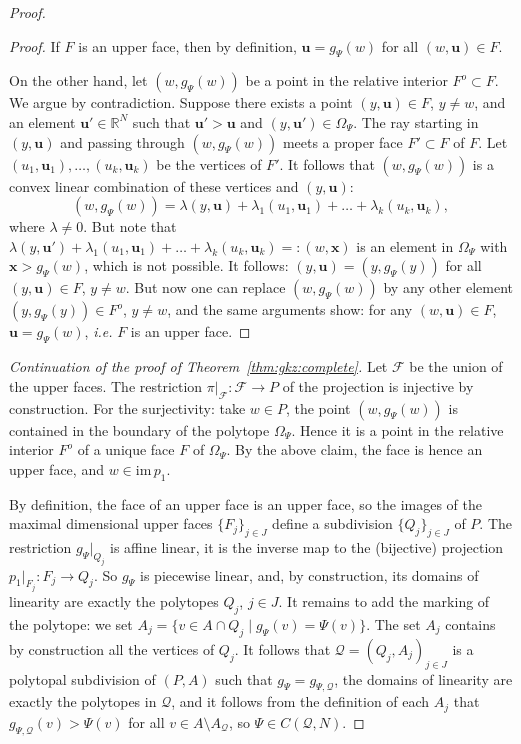 \documentclass[10pt,a4paper]{amsart}
\begin{document}
\begin{proof}
\begin{proof}
If $F$ is an upper face, then by definition, $\mathbf u=g_{\Psi}(w)$ for all $( w,\mathbf u)\in F$. 

On the other hand, let $(  w,g_{\Psi}(  w))$ be a point in the relative interior $F^o\subset F$. We argue by contradiction. Suppose there exists a point $( y, \mathbf u)\in F$, $ y\not= w$, and an element 
$\mathbf u'\in \mathbb R^N$ such that $\mathbf u'>\mathbf u$ and $(  y, \mathbf u')\in \Omega_\Psi$. 
The ray starting in $(  y,\mathbf u)$ and passing through $(  w,g_{\Psi}( w))$ 
meets a proper face $F'\subset F$ of $F$. 
Let $( u_1,\mathbf u_1),\ldots,(  u_k,\mathbf u_k)$ be the vertices of $F'$. It follows that 
$(  w,g_{\Psi}(  w))$ is a convex linear combination of these vertices and $(  y,\mathbf u)$:
\[
(  w,g_{\Psi}(  w))= \lambda (  y,\mathbf u)+\lambda_1(  u_1,\mathbf u_1)+\ldots +\lambda_k(  u_k,\mathbf u_k),
\]
where $\lambda\not=0$. But note that $\lambda (  y,\mathbf u')+\lambda_1( u_1,\mathbf u_1)+\ldots +\lambda_k(  u_k,\mathbf u_k)=:(  w,\mathbf x)$ 
is an element in $\Omega_\Psi$ with $\mathbf x>g_{\Psi}(  w)$, which is not possible. It follows: $(  y,\mathbf u)
=(  y,g_{\Psi}(  y))$ for all $(  y,\mathbf u)\in F$, $  y\not=  w$. But now one can replace $(  w,g_{\Psi}(  w))$ 
by any other element $(  y,g_{\Psi}(  y))\in F^o$, $  y\not=  w$, and the same arguments show: for any
$(  w,\mathbf u)\in F$, $\mathbf u=g_{\Psi}(  w)$, \emph{i.e.} $F$ is an upper face.
\end{proof}

\par
\noindent
\textit{Continuation of the proof of Theorem~\ref{thm:gkz:complete}.}
Let $\mathcal F$ be the union of the upper faces. The restriction $\pi\vert_{\mathcal F}:\mathcal F\rightarrow P$ of the projection is injective by construction. For the surjectivity: take $w\in P$, the point $(w,g_{\Psi}( w))$ is contained in the boundary of the polytope $\Omega_\Psi$. Hence it is a point in the relative interior $F^o$ of a unique face $F$ of $\Omega_\Psi$. By the above claim, the face is hence an upper face, and 
$  w\in \mathrm{im\,}p_1$.

By definition, the face of an upper face is an upper face, so the images of the maximal dimensional 
upper faces $\{F_j\}_{j\in J}$ define a subdivision $\{Q_j\}_{j\in J}$ of $P$.
The restriction $g_\Psi\vert_{Q_j}$ is affine linear, it is the inverse map to the (bijective) projection 
$p_1\vert_{F_j}: F_j\rightarrow Q_j$. So $g_{\Psi}$ is piecewise linear, and, by construction, its domains of linearity are 
exactly the polytopes $Q_j$, $j\in J$. It remains to add the marking of the polytope: we set 
$A_j=\{  v\in A\cap Q_j\mid  g_\Psi( v)=\Psi({v})\}$. The set $A_j$ contains by construction all the vertices of $Q_j$. 
It follows that $\mathcal Q=(Q_j,A_j)_{j\in J}$ is a polytopal subdivision of $(P, A)$ such that $g_{\Psi}=g_{\Psi,\mathcal Q}$, 
the domains of linearity are exactly the polytopes in $\mathcal Q$, and it follows from the definition of each $A_j$ that $g_{\Psi,\mathcal Q}(v)>\Psi(v)$ 
for all $v\in A\setminus A_{\mathcal Q}$, so $\Psi\in C(\mathcal Q, N)$.
\end{proof}
\end{document}
